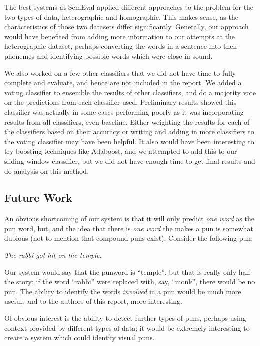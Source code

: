 \documentclass{article}
\begin{document}
The best systems at SemEval applied different approaches to the problem for the
two types of data, heterographic and homographic. This makes sense, as the
characteristics of those two datasets differ significantly. Generally, our
approach would have benefited from adding more information to our attempts at
the heterographic dataset, perhaps converting the words in a sentence into their
phonemes and identifying possible words which were close in sound.

We also worked on a few other classifiers that we did not have time to fully complete and evaluate, and hence are not included in the report. We added a voting classifier to ensemble the results of other classifiers, and do a majority vote on the predictions from each classifier used. Preliminary results showed this classifier was actually in some cases performing poorly as it was incorporating results from all classifiers, even baseline. Either weighting the results for each of the classifiers based on their accuracy or writing and adding in more classifiers to the voting classifier may have been helpful. It also would have been interesting to try boosting techniques like Adaboost, and we attempted to add this to our sliding window classifier, but we did not have enough time to get final results and do analysis on this method.


\subsection{Future Work}

An obvious shortcoming of our system is that it will only predict \emph{one
word} as the pun word, but, and the idea that there is \emph{one word} the makes
a pun is somewhat dubious (not to mention that compound puns exist). Consider
the following pun: 
\begin{center}
	\emph{The rabbi got hit on the temple.}
\end{center}
Our system would say that the punword is ``temple'', but that is really only half
the story; if the word ``rabbi'' were replaced with, say, ``monk'', there would
be no pun. The ability to identify the words \emph{involved} in a pun would be
much more useful, and to the authors of this report, more interesting.

Of obvious interest is the ability to detect further types of puns, perhaps
using context provided by different types of data; it would be extremely
interesting to create a system which could identify visual puns. 
\end{document}
